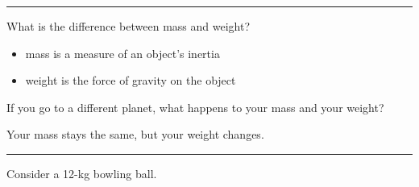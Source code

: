 \documentclass[10pt]{exam}
\begin{document}
\begin{questions}
  \hrule



  \question
    What is the difference between mass and weight?

    \begin{solution}[\stretch{1}]
      \begin{itemize}
        \item mass is a measure of an object's inertia
        \item weight is the force of gravity on the object
      \end{itemize}
    \end{solution}


	\question 
    If you go to a different planet, what happens to your mass and your weight?

    \begin{solution}[\stretch{2}]
      Your mass stays the same, but your weight changes.
    \end{solution}

  \hrule

  \question
    Consider a 12-kg bowling ball.
\end{questions}
\end{document}
